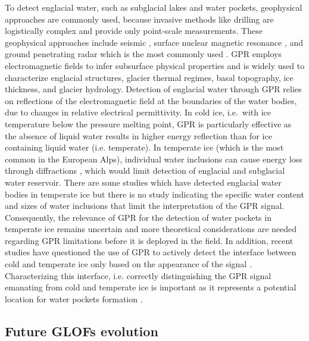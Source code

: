 To detect englacial water, such as subglacial lakes and water pockets, geophysical approaches are commonly used, because invasive methods like drilling are logistically complex and provide only point-scale measurements. These geophysical approaches include seismic \citep[e.g.][]{Guillemot&al2024}, surface nuclear magnetic resonance \citep[SNMR, e.g.][]{Legchenko&2014}, and ground penetrating radar which is the most commonly used \citep[GPR, see][for a review on glaciological applications]{Woodward&Burke2007,Plewes&Hubbard2001,Navarro&Eisen2009,Schroeder&al2020}. GPR employs electromagnetic fields to infer subsurface physical properties and is widely used to characterize englacial structures, glacier thermal regimes, basal topography, ice thickness, and glacier hydrology. Detection of englacial water through GPR relies on reflections of the electromagnetic field at the boundaries of the water bodies, due to changes in relative electrical permittivity. In cold ice, i.e.\ with ice temperature below the pressure melting point, GPR is particularly effective as the absence of liquid water results in higher energy reflection than for ice containing liquid water (i.e. temperate). In temperate ice (which is the most common in the European Alps), individual water inclusions can cause energy loss through diffractions \citep{Smith&Evans1972,Murray&al2000}, which would limit detection of englacial and subglacial water reservoir. There are some studies which have detected englacial water bodies in temperate ice \citep[e.g.][]{Egli&al2021b,Church&al2021,Ruols&al2023} but there is no study indicating the specific water content and sizes of water inclusions that limit the interpretation of the GPR signal. Consequently, the relevance of GPR for the detection of water pockets in temperate ice remains uncertain and more theoretical considerations are needed regarding GPR limitations before it is deployed in the field. In addition, recent studies have questioned the use of GPR to actively detect the interface between cold and temperate ice only based on the appearance of the signal \citep[e.g.][]{Brown&al2009}. Characterizing this interface, i.e. correctly distinguishing the GPR signal emanating from cold and temperate ice is important as it represents a potential location for water pockets formation \citep[e.g.][]{Vincent&al2012}. 


\subsection{Future GLOFs evolution}

